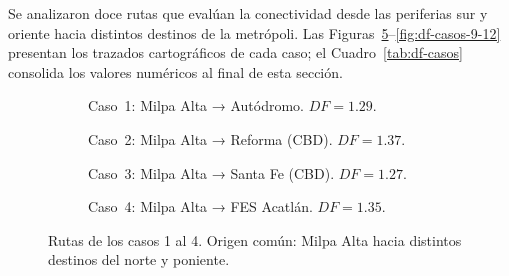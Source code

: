 Se analizaron doce rutas que evalúan la conectividad desde las periferias sur y
oriente hacia distintos destinos de la metrópoli. Las
Figuras~\ref{fig:df-casos-1-4}--\ref{fig:df-casos-9-12} presentan los trazados
cartográficos de cada caso; el Cuadro~\ref{tab:df-casos} consolida los valores
numéricos al final de esta sección.

\begin{figure}[H]
    \centering
    \begin{subfigure}[t]{0.48\textwidth}
        \caption{Caso~1: Milpa Alta → Autódromo. $DF = 1.29$.}
        \label{fig:df-c01}
    \end{subfigure}
    \hfill
    \begin{subfigure}[t]{0.48\textwidth}
        \caption{Caso~2: Milpa Alta → Reforma (CBD). $DF = 1.37$.}
        \label{fig:df-c02}
    \end{subfigure}

    \vspace{0.5em}
    \begin{subfigure}[t]{0.48\textwidth}
        \caption{Caso~3: Milpa Alta → Santa Fe (CBD). $DF = 1.27$.}
        \label{fig:df-c03}
    \end{subfigure}
    \hfill
    \begin{subfigure}[t]{0.48\textwidth}
        \caption{Caso~4: Milpa Alta → FES Acatlán. $DF = 1.35$.}
        \label{fig:df-c04}
    \end{subfigure}
    \caption[Casos de estudio del Factor de Desviación: 1–4]{Rutas de los casos 1 al 4.
    Origen común: Milpa Alta hacia distintos destinos del norte y poniente.}
    \label{fig:df-casos-1-4}
\end{figure}

